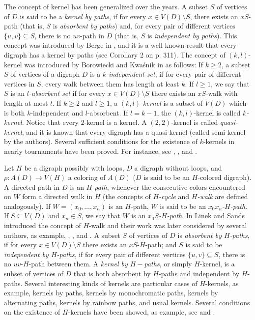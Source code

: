 \documentclass[10pt,a4paper]{article}
\begin{document}
The concept of kernel has been generalized over the years. A subset $S$ of vertices of $D$ is said to be a \emph{kernel by paths}, if for every $x \in V(D)\setminus S$, there exists an $xS$-path (that is, $S$ is \emph{absorbent by paths}) and, for every pair of different vertices $\{ u, v \} \subseteq S$, there is no $uv$-path in $D$ (that is, $S$ is \emph{independent by paths}). 
This concept was introduced by Berge in \cite{19}, and it is a well known result that every digraph has a kernel by paths \cite{19} (see Corollary 2 on p. 311).
 The concept of $(k,l)$-kernel was introduced by Borowiecki and Kwa\'snik in \cite{14} as follows:
 If $k \geq 2$, a subset $S$ of vertices of a digraph $D$ is a \emph{$k$-independent set}, if for every pair of different vertices in $S$, every walk between them has length at least $k$. If $l \geq 1$, we say that $S$ is an \emph{$l$-absorbent set} if for every $x \in V(D) \setminus S$ there exists an $xS$-walk with length at most $l$.
 If $k \geq 2$ and $l \geq 1 $, a \emph{$(k,l)$-kernel} is a subset of $V(D)$ which is both $k$-independent and $l$-absorbent.
  If $l=k-1$, the $(k,l)$-kernel is called \emph{$k$-kernel}. Notice that every $2$-kernel is a kernel. 
  A $(2,2)$-kernel is called \textit{quasi-kernel}, and it is known that every digraph has a quasi-kernel \cite{qker} (called semi-kernel by the authors).  Several sufficient conditions for the existence of $k$-kernels in nearly tournaments have been proved. For instance, see \cite{localtour1},  \cite{qtrans5}, \cite{qtrans1} and \cite{qtrans4}.

Let $H$ be a digraph possibly with loops, $D$ a digraph  without loops, and $\rho : A(D) \rightarrow V(H)$ a coloring of $A(D)$ ($D$ is said to be an $H$-colored digraph). 
A directed path in $D$ is an \emph{$H$-path}, whenever the consecutive colors encountered on $W$ form a directed walk in $H$
(the concepts of \emph{$H$-cycle} and \emph{$H$-walk} are defined analogously).
If $W=(x_{0}, \ldots , x_{n})$ is an $H$-path, $W$ is said to be an \emph{$x_{0}x_{n}$-$H$-path}. If $S \subseteq V(D)$ and $x_{n}\in S$, we say that $W$ is an \emph{$x_{0}S$-$H$-path}. 
In \cite{8} Linek and Sands introduced the concept of $H$-walk and their work was later considered by several authors, as example, \cite{7}, \cite{17}, \cite{12} and \cite{16}.
 A subset $S$ of vertices of $D$ is \emph{absorbent by $H$-paths}, if for every $x \in V(D) \setminus S$ there exists an $xS$-$H$-path; and $S$ is said to be \emph{independent by $H$-paths}, if for every pair of different vertices $\{ u, v \} \subseteq S$, there is no $uv$-$H$-path between them.
  A \emph{kernel by $H-$paths}, or simply $H$-kernel, is a subset of vertices of $D$ that is both absorbent by $H$-paths and independent by $H$-paths.
Several interesting kinds of kernels are particular cases of $H$-kernels, as example, kernels by paths, kernels by monochromatic paths, kernels by alternating paths, kernels by rainbow paths, and usual kernels. Several conditions on the existence of $H$-kernels have been showed, as example, see \cite{12} and \cite{18}.   
  
\end{document}
